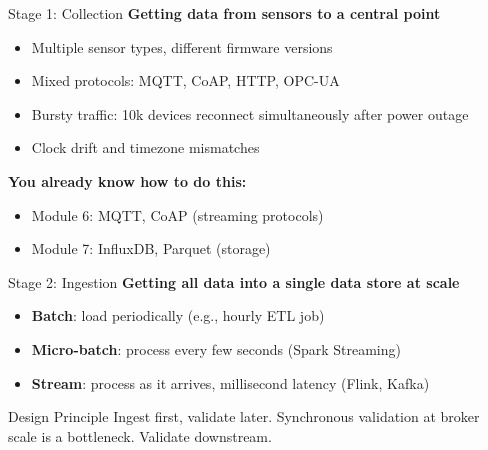 \documentclass[aspectratio=169,11pt]{beamer}
\begin{document}
\begin{frame}{Stage 1: Collection}
    \textbf{Getting data from sensors to a central point}
    \begin{itemize}
        \item Multiple sensor types, different firmware versions
        \item Mixed protocols: MQTT, CoAP, HTTP, OPC-UA
        \item Bursty traffic: 10k devices reconnect simultaneously after power outage
        \item Clock drift and timezone mismatches
    \end{itemize}

    \vspace{0.3cm}
    \textbf{You already know how to do this:}
    \begin{itemize}
        \item Module 6: MQTT, CoAP (streaming protocols)
        \item Module 7: InfluxDB, Parquet (storage)
    \end{itemize}
\end{frame}

\begin{frame}{Stage 2: Ingestion}
    \textbf{Getting all data into a single data store at scale}
    \begin{itemize}
        \item \textbf{Batch}: load periodically (e.g., hourly ETL job)
        \item \textbf{Micro-batch}: process every few seconds (Spark Streaming)
        \item \textbf{Stream}: process as it arrives, millisecond latency (Flink, Kafka)
    \end{itemize}

    \vspace{0.5cm}
    \begin{alertblock}{Design Principle}
        Ingest first, validate later. Synchronous validation at broker scale is a bottleneck. Validate downstream.
    \end{alertblock}
\end{frame}
\end{document}
